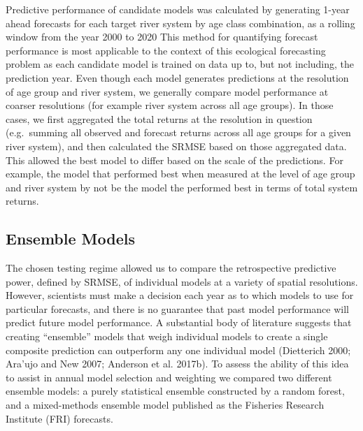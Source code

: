\documentclass[
]{article}
\begin{document}
Predictive performance of candidate models was calculated by generating 1-year ahead forecasts for each target river system by age class combination, as a rolling window from the year 2000 to 2020 This method for quantifying forecast performance is most applicable to the context of this ecological forecasting problem as each candidate model is trained on data up to, but not including, the prediction year. Even though each model generates predictions at the resolution of age group and river system, we generally compare model performance at coarser resolutions (for example river system across all age groups). In those cases, we first aggregated the total returns at the resolution in question (e.g.~summing all observed and forecast returns across all age groups for a given river system), and then calculated the SRMSE based on those aggregated data. This allowed the best model to differ based on the scale of the predictions. For example, the model that performed best when measured at the level of age group and river system by not be the model the performed best in terms of total system returns.

\hypertarget{ensemble-models}{%
\subsection{Ensemble Models}\label{ensemble-models}}

The chosen testing regime allowed us to compare the retrospective predictive power, defined by SRMSE, of individual models at a variety of spatial resolutions. However, scientists must make a decision each year as to which models to use for particular forecasts, and there is no guarantee that past model performance will predict future model performance. A substantial body of literature suggests that creating ``ensemble'' models that weigh individual models to create a single composite prediction can outperform any one individual model (Dietterich 2000; Ara'ujo and New 2007; Anderson et al. 2017b). To assess the ability of this idea to assist in annual model selection and weighting we compared two different ensemble models: a purely statistical ensemble constructed by a random forest, and a mixed-methods ensemble model published as the Fisheries Research Institute (FRI) forecasts.
\end{document}
